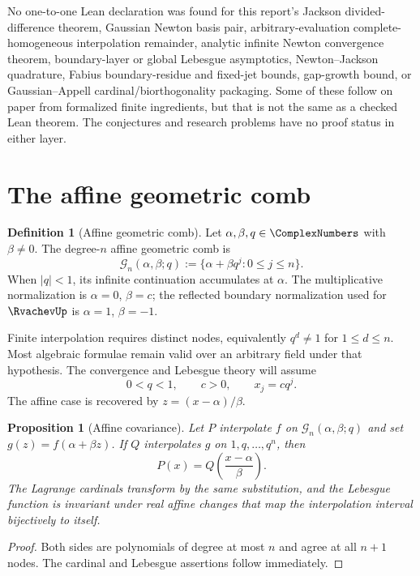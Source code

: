 \documentclass[11pt,oneside]{book}
\numberwithin{equation}{chapter}
\newtheorem{proposition}[theorem]{Proposition}
\theoremstyle{definition}
\newtheorem{definition}[theorem]{Definition}
\theoremstyle{remark}
\begin{document}
No one-to-one Lean declaration was found for this report's Jackson
divided-difference theorem, Gaussian Newton basis pair, arbitrary-evaluation
complete-homogeneous interpolation remainder, analytic infinite Newton
convergence theorem, boundary-layer or global Lebesgue asymptotics,
Newton--Jackson quadrature, Fabius boundary-residue and fixed-jet bounds,
gap-growth bound, or Gaussian--Appell cardinal/biorthogonality packaging.
Some of these follow on paper from formalized finite ingredients, but that is
not the same as a checked Lean theorem.  The conjectures and research
problems have no proof status in either layer.

\section{The affine geometric comb}

\begin{definition}[Affine geometric comb]
Let $\alpha,\beta,q\in\ComplexNumbers$ with $\beta\ne0$.  The degree-$n$ affine geometric
comb is
\[
 \mathcal G_n(\alpha,\beta;q)
 :=\{\alpha+\beta q^j:0\le j\le n\}.
\]
When $|q|<1$, its infinite continuation accumulates at $\alpha$.  The
multiplicative normalization is $\alpha=0$, $\beta=c$; the reflected
boundary normalization used for $\RvachevUp$ is $\alpha=1$, $\beta=-1$.
\end{definition}

Finite interpolation requires distinct nodes, equivalently
$q^d\ne1$ for $1\le d\le n$.  Most algebraic formulae remain valid over an
arbitrary field under that hypothesis.  The convergence and Lebesgue theory
will assume
\begin{equation}
 0<q<1,
 \qquad c>0,
 \qquad x_j=cq^j.
 \label{eq:real-normalization}
\end{equation}
The affine case is recovered by $z=(x-\alpha)/\beta$.

\begin{proposition}[Affine covariance]
Let $P$ interpolate $f$ on $\mathcal G_n(\alpha,\beta;q)$ and set
$g(z)=f(\alpha+\beta z)$.  If $Q$ interpolates $g$ on
$1,q,\ldots,q^n$, then
\[
 P(x)=Q\!\left(\frac{x-\alpha}{\beta}\right).
\]
The Lagrange cardinals transform by the same substitution, and the Lebesgue
function is invariant under real affine changes that map the interpolation
interval bijectively to itself.
\end{proposition}

\begin{proof}
Both sides are polynomials of degree at most $n$ and agree at all $n+1$
nodes.  The cardinal and Lebesgue assertions follow immediately.
\end{proof}
\end{document}
